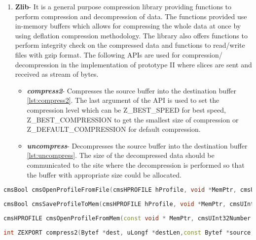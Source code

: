 \begin{enumerate}
\item \textbf{Zlib}- It is a general purpose compression library providing functions to perform compression and decompression of data. The functions provided use in-memory buffers which allows for compressing the whole data at once by using deflation compression methodology. The library also offers functions to perform integrity check on the compressed data and functions to read/write files with gzip format. The following APIs are used for compression/ decompression in the implementation of prototype II where slices are sent and received as stream of bytes.  
\begin{itemize}
\item \textbf{\textit{compress2}}- Compresses the source buffer into the destination buffer \ref{lst:compress2}. The last argument of the API is used to set the compression level which can be Z\_BEST\_SPEED for best speed, Z\_BEST\_COMPRESSION to get the smallest size of compression or Z\_DEFAULT\_COMPRESSION for default compression.
\item \textbf{\textit{uncompress}}- Decompresses the source buffer into the destination buffer \ref{lst:uncompress}. The size of the decompressed data should be communicated to the site where the decompression is performed so that the buffer with appropriate size could be allocated.
\end{itemize}
\end{enumerate}
   
\begin{lstlisting}[language=C++,label={lst:OpenProfileFromFile},caption={Open profile from File}]
cmsBool cmsOpenProfileFromFile(cmsHPROFILE hProfile, void *MemPtr, cmsUInt32Number* BytesNeeded);
\end{lstlisting} 

\begin{lstlisting}[language=C++,label={lst:SaveProfileToMem},caption={Save profile to Memory}]
cmsBool cmsSaveProfileToMem(cmsHPROFILE hProfile, void *MemPtr, cmsUInt32Number* BytesNeeded);
\end{lstlisting} 

\begin{lstlisting}[language=C++,label={lst:OpenProfileFromMem},caption={Open profile from Memory}]
cmsHPROFILE cmsOpenProfileFromMem(const void * MemPtr, cmsUInt32Number dwSize);
\end{lstlisting} 

\begin{lstlisting}[language=C++,label={lst:compress2},caption={API to compress the data}]
int ZEXPORT compress2(Bytef *dest, uLongf *destLen,const Bytef *source, uLong sourceLen, int level);
\end{lstlisting} 

